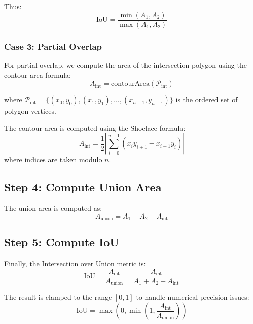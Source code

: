 \documentclass[11pt]{article}
\begin{document}
Thus:
\begin{equation}
\text{IoU} = \frac{\min(A_1, A_2)}{\max(A_1, A_2)}
\end{equation}

\subsubsection{Case 3: Partial Overlap}

For partial overlap, we compute the area of the intersection polygon using the contour area formula:
\begin{equation}
A_{\text{int}} = \text{contourArea}(\mathcal{P}_{\text{int}})
\end{equation}

where $\mathcal{P}_{\text{int}} = \{(x_0, y_0), (x_1, y_1), \ldots, (x_{n-1}, y_{n-1})\}$ is the ordered set of polygon vertices.

The contour area is computed using the Shoelace formula:
\begin{equation}
A_{\text{int}} = \frac{1}{2} \left| \sum_{i=0}^{n-1} (x_i y_{i+1} - x_{i+1} y_i) \right|
\end{equation}
where indices are taken modulo $n$.

\subsection{Step 4: Compute Union Area}

The union area is computed as:
\begin{equation}
A_{\text{union}} = A_1 + A_2 - A_{\text{int}}
\end{equation}

\subsection{Step 5: Compute IoU}

Finally, the Intersection over Union metric is:
\begin{equation}
\text{IoU} = \frac{A_{\text{int}}}{A_{\text{union}}} = \frac{A_{\text{int}}}{A_1 + A_2 - A_{\text{int}}}
\end{equation}

The result is clamped to the range $[0, 1]$ to handle numerical precision issues:
\begin{equation}
\text{IoU} = \max\left(0, \min\left(1, \frac{A_{\text{int}}}{A_{\text{union}}}\right)\right)
\end{equation}
\end{document}
